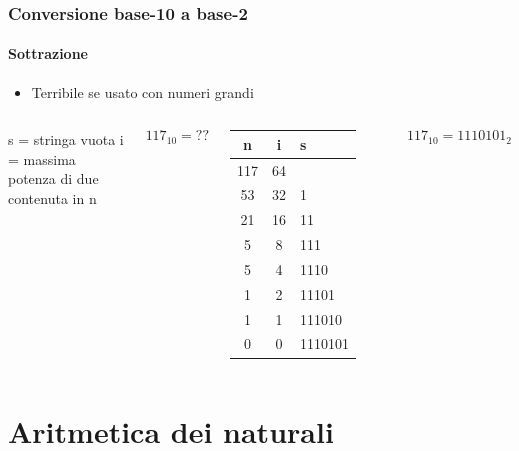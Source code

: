 \documentclass{beamer}
\begin{document}
  \begin{frame}
    \frametitle{Conversione base-10 a base-2}
    \framesubtitle{Sottrazione}
    \begin{itemize}
    		\item Terribile se usato con numeri grandi
    \end{itemize}
	\begin{columns}
    \footnotesize{
    \begin{algorithm}[H]
    		\SetAlgoLined
			 s = stringa vuota\;
			 i = massima potenza di due contenuta in n\;		 
    \end{algorithm}
	}
 	\footnotesize{		
		\pause
 		$$117_{10} = ??$$
	  \pause
		\begin{tabular}{|c|c|l|}
		\hline
		 n & i & s \\
		\hline
     117 & 64 & \\
     53 & 32 & 1 \\
     21 & 16 & 11 \\
     5 & 8 & 111 \\
     5 & 4 & 1110 \\
     1 & 2 & 11101 \\
     1 & 1 & 111010 \\
     0 & 0 & 1110101 \\
		\hline
		\end{tabular}
	  $$117_{10} = 1110101_{2}$$ 
	}		
  \end{columns}
  \end{frame}
  
  \section[Operations]{Aritmetica dei naturali}
\end{document}
